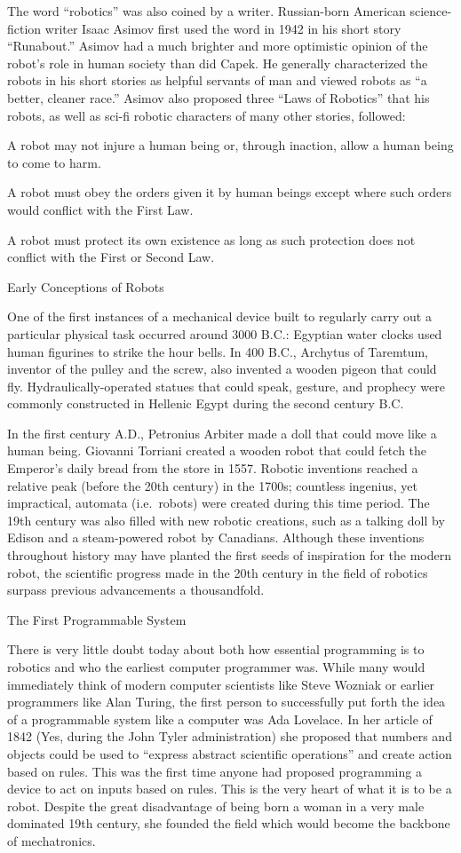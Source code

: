\documentclass[
]{book}
\begin{document}
The word ``robotics'' was also coined by a writer. Russian-born American science-fiction writer Isaac Asimov first used the word in 1942 in his short story ``Runabout.'' Asimov had a much brighter and more optimistic opinion of the robot's role in human society than did Capek. He generally characterized the robots in his short stories as helpful servants of man and viewed robots as ``a better, cleaner race.'' Asimov also proposed three ``Laws of Robotics'' that his robots, as well as sci-fi robotic characters of many other stories, followed:

A robot may not injure a human being or, through inaction, allow a human being to come to harm.

A robot must obey the orders given it by human beings except where such orders would conflict with the First Law.

A robot must protect its own existence as long as such protection does not conflict with the First or Second Law.

Early Conceptions of Robots

One of the first instances of a mechanical device built to regularly carry out a particular physical task occurred around 3000 B.C.: Egyptian water clocks used human figurines to strike the hour bells. In 400 B.C., Archytus of Taremtum, inventor of the pulley and the screw, also invented a wooden pigeon that could fly. Hydraulically-operated statues that could speak, gesture, and prophecy were commonly constructed in Hellenic Egypt during the second century B.C.

In the first century A.D., Petronius Arbiter made a doll that could move like a human being. Giovanni Torriani created a wooden robot that could fetch the Emperor's daily bread from the store in 1557. Robotic inventions reached a relative peak (before the 20th century) in the 1700s; countless ingenius, yet impractical, automata (i.e.~robots) were created during this time period. The 19th century was also filled with new robotic creations, such as a talking doll by Edison and a steam-powered robot by Canadians. Although these inventions throughout history may have planted the first seeds of inspiration for the modern robot, the scientific progress made in the 20th century in the field of robotics surpass previous advancements a thousandfold.

The First Programmable System

There is very little doubt today about both how essential programming is to robotics and who the earliest computer programmer was. While many would immediately think of modern computer scientists like Steve Wozniak or earlier programmers like Alan Turing, the first person to successfully put forth the idea of a programmable system like a computer was Ada Lovelace. In her article of 1842 (Yes, during the John Tyler administration) she proposed that numbers and objects could be used to ``express abstract scientific operations'' and create action based on rules. This was the first time anyone had proposed programming a device to act on inputs based on rules. This is the very heart of what it is to be a robot. Despite the great disadvantage of being born a woman in a very male dominated 19th century, she founded the field which would become the backbone of mechatronics.
\end{document}
